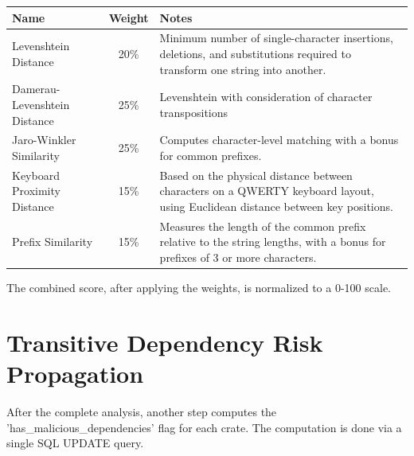 \begin{tabularx}{\textwidth}{|l|c|X|}
\hline
\textbf{Name} & \textbf{Weight} & \textbf{Notes} \\
\hline
Levenshtein Distance & 20\% & Minimum number of single-character insertions, deletions, and substitutions required to transform one string into another. \\
\hline
Damerau-Levenshtein Distance & 25\% & Levenshtein with consideration of character transpositions \\
\hline
Jaro-Winkler Similarity & 25\% & Computes character-level matching with a bonus for common prefixes. \\
\hline
Keyboard Proximity Distance & 15\% & Based on the physical distance between characters on a QWERTY keyboard layout, using Euclidean distance between key positions. \\
\hline
Prefix Similarity & 15\% & Measures the length of the common prefix relative to the string lengths, with a bonus for prefixes of 3 or more characters. \\
\hline
\end{tabularx}

The combined score, after applying the weights, is normalized to a 0-100 scale.

\section{Transitive Dependency Risk Propagation}\label{sect:dep-risk}

After the complete analysis, another step computes the 'has\_malicious\_dependencies' flag for each crate. The computation is done via a single SQL UPDATE query.